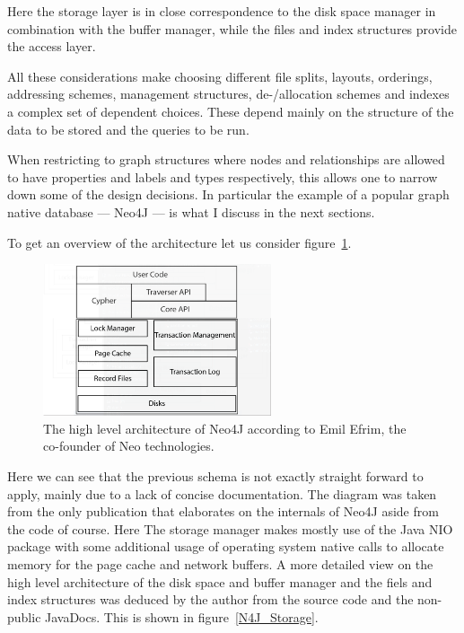 \documentclass[a4paper,10pt]{article}
\begin{document}
Here the storage layer is in close correspondence to the disk space manager in combination with the buffer manager, while the files and index structures provide the access layer.

All these considerations make choosing different file splits, layouts, orderings, addressing schemes, management structures, de-/allocation schemes and indexes a complex set of dependent choices. 
These depend mainly on the structure of the data to be stored and the queries to be run. 

When restricting to graph structures where nodes and relationships are allowed to have properties and labels and types respectively, this allows one to narrow down some of the design decisions. In particular the example of a popular graph native database --- Neo4J --- is what I discuss in the next sections. 

To get an overview of the architecture let us consider figure~\ref{N4J_HLA_Emil}. 

\begin{figure}[htp]\label{N4J_HLA_Emil}
 \begin{center}
  \includegraphics[keepaspectratio,width=0.6\textwidth]{img/intro/N4J_HLA_Emil.png}
 \end{center}
 \caption{The high level architecture of Neo4J according to Emil Efrim, the co-founder of Neo technologies.} %
\end{figure}

Here we can see that the previous schema is not exactly straight forward to apply, mainly due to a lack of concise documentation. The diagram was taken from the only publication that elaborates on the internals of Neo4J aside from the code of course. Here The storage manager makes mostly use of the Java NIO package with some additional usage of operating system native calls to allocate memory for the page cache and network buffers. 
A more detailed view on the high level architecture of the disk space and buffer manager and the fiels and index structures was deduced by the author from the source code and the non-public JavaDocs. This is shown in figure~\ref{N4J_Storage}.
\end{document}
